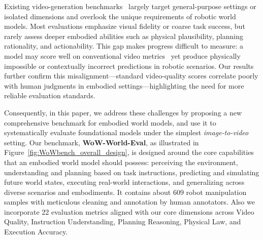 Existing video-generation benchmarks~\cite{feng2024tc,ling2025vmbench,li2025worldmodelbench,yue2025ewmbench,liu2024evalcrafter,ji2024t2vbench,zheng2025vbench} largely target general-purpose settings or isolated dimensions and overlook the unique requirements of robotic world models. Most evaluations emphasize visual fidelity or coarse task success, but rarely assess deeper embodied abilities such as physical plausibility, planning rationality, and actionability. This gap makes progress difficult to measure: a model may score well on conventional video metrics~\cite{unterthiner2018towards,1284395,Oquab2023DINOv2,fardo2016formalevaluationpsnrquality} yet produce physically impossible or contextually incorrect predictions in robotic scenarios. Our results further confirm this misalignment—standard video-quality scores correlate poorly with human judgments in embodied settings—highlighting the need for more reliable evaluation standards.

Consequently, in this paper, we address these challenges by proposing a new comprehensive benchmark for embodied world models, and use it to systematically evaluate foundational models under the simplest \textit{image-to-video} setting. Our benchmark, \textbf{WoW-World-Eval}, as illustrated in Figure~\ref{fig:WoWbench_overall_design}, is designed around the core capabilities that an embodied world model should possess: perceiving the environment, understanding and planning based on task instructions, predicting and simulating future world states, executing real-world interactions, and generalizing across diverse scenarios and embodiments.
It contains about 609 robot manipulation samples with meticulous cleaning and annotation by human annotators. Also we incorporate 22 evaluation metrics aligned with our core dimensions across Video Quality, Instruction Understanding, Planning Reasoning, Physical Law, and Execution Accuracy.

